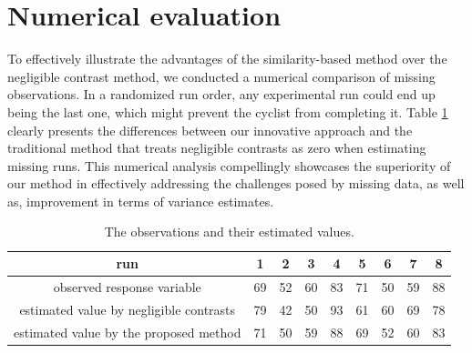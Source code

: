 \documentclass[twoside]{article}
\begin{document}
\section{Numerical evaluation}\label{sec5}
To effectively illustrate the advantages of the similarity-based method over the negligible contrast method, we conducted a numerical comparison of missing observations. In a randomized run order, any experimental run could end up being the last one, which might prevent the cyclist from completing it. Table \ref{tab3} clearly presents the differences between our innovative approach and the traditional method that treats negligible contrasts as zero when estimating missing runs. This numerical analysis compellingly showcases the superiority of our method in effectively addressing the challenges posed by missing data, as well as, improvement in terms of variance estimates.
\begin{table}[h]
\begin{center}
\small
\caption{The observations and their estimated values.}\label{tab3}
\begin{tabular}{c|cccccccc}
  \hline
run   & 1 & 2 & 3& 4 & 5 & 6 & 7 &8 \\
  \hline
 observed response variable & 69 & 52 & 60 & 83 & 71 & 50 & 59 &88\\
  \hline
      estimated value by negligible contrasts & 79 & 42 & 50 & 93 &61& 60 & 69 & 78\\
\hline
estimated value by the proposed method & 71 & 50 & 59 & 88 &69& 52 & 60 & 83\\
  \hline
\end{tabular}
\end{center}
\end{table}

\end{document}
